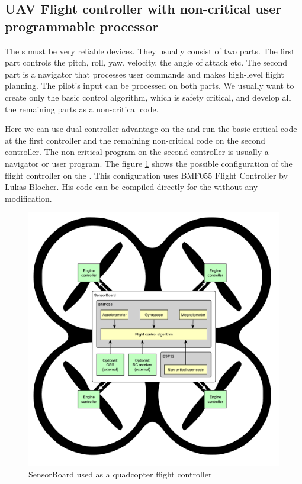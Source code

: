 \subsection{UAV Flight controller with non-critical user programmable processor}
\label{ExampleBMF055FlightController}
The s must be very reliable devices. They usually consist of two parts. The first part controls the pitch, roll, yaw, velocity, the angle of attack etc. The second part is a navigator that processes user commands and makes high-level flight planning. The pilot's input can be processed on both parts. We usually want to create only the basic control algorithm, which is safety critical, and develop all the remaining parts as a non-critical code.

Here we can use dual controller advantage on the  and run the basic critical code at the first controller and the remaining non-critical code on the second controller. The non-critical program on the second controller is usually a navigator or user program. The figure \ref{UEFlightController} shows the possible configuration of the flight controller on the . This configuration uses BMF055 Flight Controller \cite{BMF055flightController} by Lukas Blocher. His code can be compiled directly for the  without any modification.

\begin{figure}
    \centering
    \caption{SensorBoard used as a quadcopter flight controller}
    \label{UEFlightController}
    \includegraphics[width=\linewidth]{img/UsageExamplesFlightController.pdf}
\end{figure}

